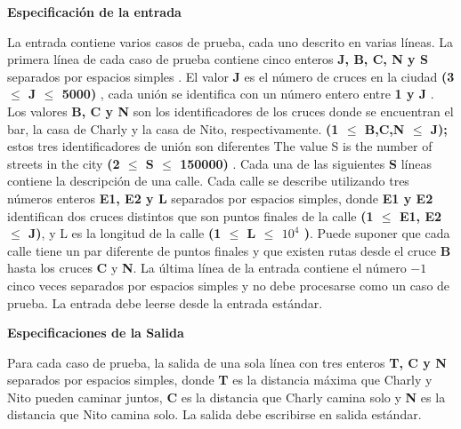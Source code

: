 \documentclass[10pt]{article}
\begin{document}
    \begin{flushleft}
        {\bf Especificaci\'on de la entrada }
    \end{flushleft}
    
    \begin{flushleft}
    La entrada contiene varios casos de prueba, cada uno descrito 
    en varias l\'ineas. La primera l\'inea de cada caso de prueba
    contiene cinco enteros {\bf J, B, C, N y S} separados por espacios
    simples . El valor {\bf J} es el n\'umero de cruces en la ciudad
    {\bf  (3 $\leq$ J $\leq$ 5000)} , cada uni\'on se identifica con un
    n\'umero entero entre {\bf 1 y J} . Los valores {\bf B, C y N} son 
    los identificadores de los cruces donde se encuentran el bar,
    la casa de Charly y la casa de Nito, respectivamente. {\bf (1 $\leq$ B,C,N $\leq$ J);}
    estos tres identificadores de uni\'on son diferentes 
    The value S is the number of streets in the city 
    {\bf (2 $\leq$ S $\leq$ 150000)} .
    Cada una de las siguientes {\bf S} l\'ineas  contiene la descripci\'on de una calle. 
    Cada calle se describe utilizando tres n\'umeros enteros {\bf E1, E2 y L} separados 
    por espacios simples, donde {\bf E1 y E2} identifican dos cruces distintos que son
    puntos finales de la calle {\bf (1 $\leq$ E1, E2 $\leq$ J)}, y L es la longitud de 
    la calle {\bf(1 $\leq$ L $\leq$ $10^4$ )}. Puede suponer que 
    cada calle tiene un par diferente de puntos finales y 
    que existen rutas desde el cruce {\bf B} hasta los cruces {\bf C} y {\bf N}. 
    La \'ultima l\'inea de la entrada contiene 
    el n\'umero $-1$ cinco veces separados por espacios simples y no debe procesarse como
    un caso de prueba. La entrada debe leerse desde la entrada est\'andar. 
    \end{flushleft}


    \begin{flushleft}
        {\bf Especificaciones de la Salida}
    \end{flushleft}

    \begin{flushleft}
        Para cada caso de prueba, la salida de una sola l\'inea 
        con tres enteros {\bf T, C y N } separados por espacios
        simples, donde {\bf T} es la distancia m\'axima que 
        Charly y Nito pueden caminar juntos, {\bf C} es la 
        distancia que Charly camina solo y {\bf N} es la distancia 
        que Nito camina solo. La salida debe escribirse en salida
        est\'andar.
    \end{flushleft}
\end{document}
